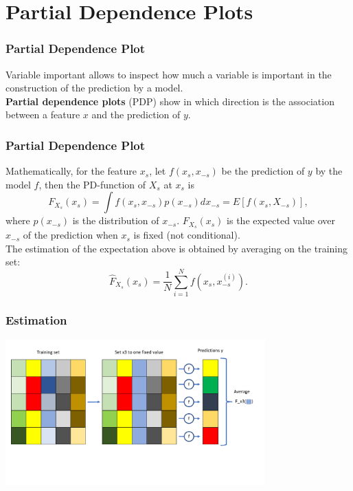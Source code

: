 \section{Partial Dependence Plots}
\begin{frame}
\frametitle{Partial Dependence Plot}
Variable important allows to inspect how much a variable is important in the construction of the prediction by a model.\\ 
\vspace{0.2cm}
{\bf Partial dependence plots} (PDP) show in which direction is the association between a feature $x$ and the prediction of $y$. 
\end{frame}
\begin{frame}
\frametitle{Partial Dependence Plot}
Mathematically, for the feature $x_s$, let $f(x_s, x_{-s})$ be the prediction of $y$ by the model $f$, then the PD-function of $X_s$ at $x_s$ is
$$
F_{X_s}(x_s) = \int f(x_s, x_{-s}) p(x_{-s}) dx_{-s} = E[f(x_s, X_{-s})],
$$
where $p(x_{-s})$ is the distribution of $x_{-s}$. $F_{X_s}(x_s)$ is the expected value over $x_{-s}$ of the prediction when $x_s$ is fixed (not conditional). \\
\vspace{0.3cm}
The estimation of the expectation above is obtained by averaging on the training set:
$$
\hat{F}_{X_s}(x_s) = \frac{1}{N}\sum_{i=1}^N f(x_s, x_{-s}^{(i)}).
$$
\end{frame}
\begin{frame}
\frametitle{Estimation}
\begin{center}
\includegraphics[width=10cm]{../Graphs/PDP_Illustr.png}
\end{center}
\end{frame}
